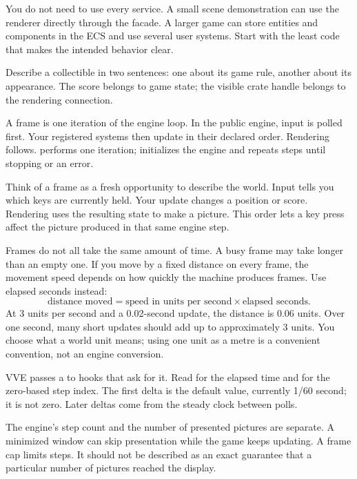 \documentclass[11pt,a4paper]{article}
\begin{document}
You do not need to use every service. A small scene demonstration can use the renderer directly through the facade. A larger game can store entities and components in the ECS and use several user systems. Start with the least code that makes the intended behavior clear.

\begin{tryit}Describe a collectible in two sentences: one about its game rule, another about its appearance. The score belongs to game state; the visible crate handle belongs to the rendering connection.\end{tryit}

A frame is one iteration of the engine loop. In the public engine, input is polled first. Your registered systems then update in their declared order. Rendering follows.  performs one iteration;  initializes the engine and repeats steps until stopping or an error.

Think of a frame as a fresh opportunity to describe the world. Input tells you which keys are currently held. Your update changes a position or score. Rendering uses the resulting state to make a picture. This order lets a key press affect the picture produced in that same engine step.

Frames do not all take the same amount of time. A busy frame may take longer than an empty one. If you move by a fixed distance on every frame, the movement speed depends on how quickly the machine produces frames. Use elapsed seconds instead:
\[
\mbox{distance moved}=\mbox{speed in units per second}\times\mbox{elapsed seconds}.
\]
At 3 units per second and a 0.02-second update, the distance is 0.06 units. Over one second, many short updates should add up to approximately 3 units. You choose what a world unit means; using one unit as a metre is a convenient convention, not an engine conversion.

VVE passes a  to hooks that ask for it. Read  for the elapsed time and  for the zero-based step index. The first delta is the default  value, currently 1/60 second; it is not zero. Later deltas come from the steady clock between polls.

The engine's step count and the number of presented pictures are separate. A minimized window can skip presentation while the game keeps updating. A frame cap limits steps. It should not be described as an exact guarantee that a particular number of pictures reached the display.
\end{document}
